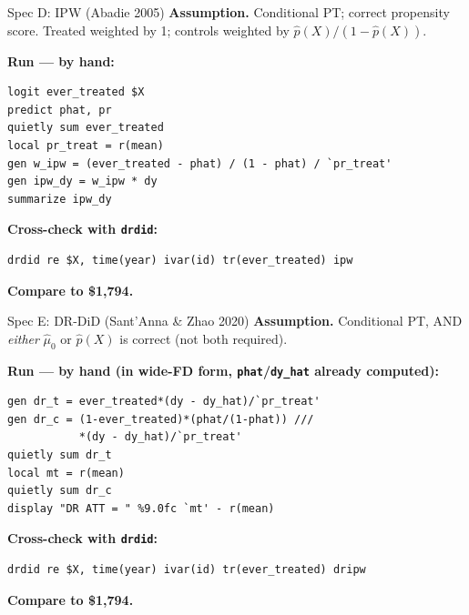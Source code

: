 \documentclass[11pt,aspectratio=169]{beamer}
\begin{document}
\begin{frame}[fragile]{Spec D: IPW (Abadie 2005)}
\textbf{Assumption.} \;Conditional PT; correct propensity score. \;Treated weighted by 1; controls weighted by $\hat p(X)/(1-\hat p(X))$.
\vspace{0.3em}

\textbf{Run --- by hand:}
\begin{lstlisting}[language={[ANSI]C},basicstyle=\ttfamily\scriptsize]
logit ever_treated $X
predict phat, pr
quietly sum ever_treated
local pr_treat = r(mean)
gen w_ipw = (ever_treated - phat) / (1 - phat) / `pr_treat'
gen ipw_dy = w_ipw * dy
summarize ipw_dy
\end{lstlisting}

\textbf{Cross-check with \texttt{drdid}:}
\begin{lstlisting}[language={[ANSI]C},basicstyle=\ttfamily\footnotesize]
drdid re $X, time(year) ivar(id) tr(ever_treated) ipw
\end{lstlisting}

\textbf{Compare to \$1,794.}
\end{frame}

\begin{frame}[fragile]{Spec E: DR-DiD (Sant'Anna \& Zhao 2020)}
\textbf{Assumption.} \;Conditional PT, AND \textit{either} $\hat\mu_0$ or $\hat p(X)$ is correct (not both required).
\vspace{0.3em}

\textbf{Run --- by hand (in wide-FD form, \texttt{phat}/\texttt{dy\_hat} already computed):}
\begin{lstlisting}[language={[ANSI]C},basicstyle=\ttfamily\tiny]
gen dr_t = ever_treated*(dy - dy_hat)/`pr_treat'
gen dr_c = (1-ever_treated)*(phat/(1-phat)) ///
           *(dy - dy_hat)/`pr_treat'
quietly sum dr_t
local mt = r(mean)
quietly sum dr_c
display "DR ATT = " %9.0fc `mt' - r(mean)
\end{lstlisting}

\textbf{Cross-check with \texttt{drdid}:}
\begin{lstlisting}[language={[ANSI]C},basicstyle=\ttfamily\footnotesize]
drdid re $X, time(year) ivar(id) tr(ever_treated) dripw
\end{lstlisting}

\textbf{Compare to \$1,794.}
\end{frame}

\end{document}
